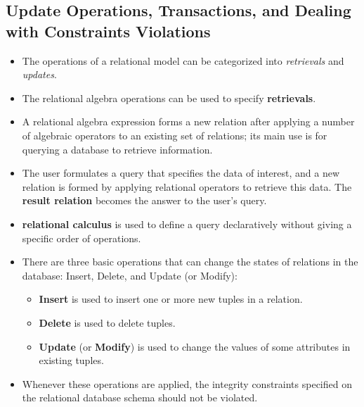 \documentclass[10pt]{article}
\newcommand{\tf}{\textbf}
\newcommand{\ti}{\textit}
\begin{document}
\subsection{Update Operations, Transactions, and Dealing with Constraints Violations}

\begin{itemize}
	\item The operations of a relational model can be categorized into \ti{retrievals} and \ti{updates}.
	\item The relational algebra operations can be used to specify \tf{retrievals}.  
	\item A relational algebra expression forms a new relation after applying a number of algebraic operators to an existing set of relations; its main use is for querying a database to retrieve information.
	\item The user formulates a query that specifies the data of interest, and a new relation is formed by applying relational operators to retrieve this data. The \tf{result relation} becomes the answer to the user's query.
	\item \tf{relational calculus} is used to define a query declaratively without giving a specific order of operations.
	\item There are three basic operations that can change the states of relations in the database: Insert, Delete, and Update (or Modify):
	\begin{itemize}
		\item \tf{Insert} is used to insert one or more new tuples in a relation.
		\item \tf{Delete} is used to delete tuples.
		\item \tf{Update} (or \tf{Modify}) is used to change the values of some attributes in existing tuples.
	\end{itemize} 
	\item Whenever these operations are applied, the integrity constraints specified on the relational database schema should not be violated. 
\end{itemize}
\end{document}
